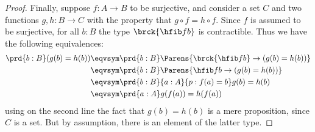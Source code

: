 \begin{proof}
Finally, suppose $f:A\to B$ to be surjective, and consider a set $C$ and two functions
$g,h:B\to C$ with the property that $g\circ f = h\circ f$. Since $f$
is assumed to be surjective, for all $b:B$ the type $\brck{\hfib f b}$ is contractible.
Thus we have the following equivalences:
\begin{align*}
\prd{b:B} (g(b)= h(b))
& \eqvsym \prd{b:B} \Parens{\brck{\hfib f b} \to (g(b)= h(b))}\\
& \eqvsym \prd{b:B} \Parens{\hfib f b \to (g(b)= h(b))}\\
& \eqvsym \prd{b:B}{a:A}{p:f(a)= b} g(b)= h(b)\\
& \eqvsym \prd{a:A} g(f(a))= h(f(a))
\end{align*}
using on the second line the fact that $g(b)=h(b)$ is a mere proposition, since $C$ is a set.
But by assumption, there is an element of the latter type.
\end{proof}
